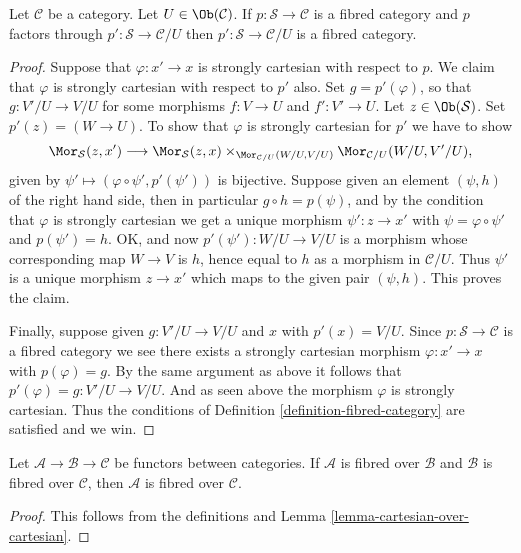 \begin{lemma}
\label{lemma-cute}
Let $\mathcal{C}$ be a category. Let $U \in \Ob(\mathcal{C})$.
If $p : \mathcal{S} \to \mathcal{C}$ is a fibred category
and $p$ factors through $p' : \mathcal{S} \to \mathcal{C}/U$
then $p' : \mathcal{S} \to \mathcal{C}/U$ is a fibred category.
\end{lemma}

\begin{proof}
Suppose that $\varphi : x' \to x$ is strongly cartesian with respect to $p$.
We claim that $\varphi$ is strongly cartesian with respect to $p'$ also.
Set $g = p'(\varphi)$, so that $g : V'/U \to V/U$
for some morphisms $f : V \to U$ and $f' : V' \to U$.
Let $z \in \Ob(\mathcal{S})$. Set $p'(z) = (W \to U)$.
To show that $\varphi$ is strongly cartesian for $p'$ we have to show
$$
\Mor_\mathcal{S}(z, x')
\longrightarrow
\Mor_\mathcal{S}(z, x)
\times_{\Mor_{\mathcal{C}/U}(W/U, V/U)}
\Mor_{\mathcal{C}/U}(W/U, V'/U),
$$
given by $\psi' \longmapsto (\varphi \circ \psi', p'(\psi'))$
is bijective. Suppose given an element $(\psi, h)$ of the
right hand side, then in particular $g \circ h = p(\psi)$,
and by the condition that $\varphi$ is strongly cartesian we
get a unique morphism $\psi' : z \to x'$ with $\psi = \varphi \circ \psi'$
and $p(\psi') = h$. OK, and now $p'(\psi') : W/U \to V/U$
is a morphism whose corresponding map $W \to V$ is $h$, hence
equal to $h$ as a morphism in $\mathcal{C}/U$. Thus $\psi'$ is
a unique morphism $z \to x'$ which maps to the given pair $(\psi, h)$.
This proves the claim.

\medskip\noindent
Finally, suppose given $g : V'/U \to V/U$ and $x$ with $p'(x) = V/U$.
Since $p : \mathcal{S} \to \mathcal{C}$ is a fibred category we
see there exists a strongly cartesian morphism $\varphi : x' \to x$
with $p(\varphi) = g$. By the same argument as above it follows
that $p'(\varphi) = g : V'/U \to V/U$. And as seen above the morphism
$\varphi$ is strongly cartesian. Thus the conditions of
Definition \ref{definition-fibred-category} are satisfied and we win.
\end{proof}

\begin{lemma}
\label{lemma-fibred-over-fibred}
Let $\mathcal{A} \to \mathcal{B} \to \mathcal{C}$ be functors between
categories. If $\mathcal{A}$ is fibred over $\mathcal{B}$ and
$\mathcal{B}$ is fibred over $\mathcal{C}$, then $\mathcal{A}$
is fibred over $\mathcal{C}$.
\end{lemma}

\begin{proof}
This follows from the definitions and
Lemma \ref{lemma-cartesian-over-cartesian}.
\end{proof}

